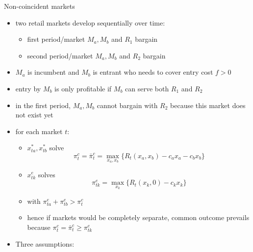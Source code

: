 \documentclass[11pt,english]{beamer}
\begin{document}
\begin{frame}[allowframebreaks]{Non-coincident markets}
  \begin{itemize}
  \item two retail markets develop sequentially over time:
    \begin{itemize}
    \item first period/market $M_a,M_b$ and $R_1$ bargain
    \item second period/market $M_a,M_b$ and $R_2$ bargain
    \end{itemize}
  \item $M_a$ is incumbent and $M_b$ is entrant who needs to cover
    entry cost $f>0$
  \item entry by $M_b$ is only profitable if $M_b$ can serve both
    $R_1$ and $R_2$
  \item in the first period, $M_a,M_b$ cannot bargain with $R_2$
    because this market does not exist yet
  \item for each market $t$:
    \begin{itemize}
    \item $x_{ta}^*,x_{tb}^*$ solve
      \begin{equation*}
        \pi^c_t = \bar{\pi}^c_t = \max_{x_a,x_b} \{ R_t(x_a,x_b)-c_a
        x_a -c_b x_b \}
      \end{equation*}
    \item $x_{tk}^e$ solves
      \begin{equation*}
        \pi_{tk}^e = \max_{x_k} \{ R_t(x_k,0)-c_k x_k \}
      \end{equation*}
    \item with $\pi_{ta}^e + \pi_{tb}^e > \pi_t^c$
    \item hence if markets would be completely separate, common
      outcome prevails because $\pi^c_t = \bar{\pi}_t^c \geq \pi_{tk}^e$
    \end{itemize}
  \item Three assumptions:
\end{itemize}
\end{frame}
\end{document}

